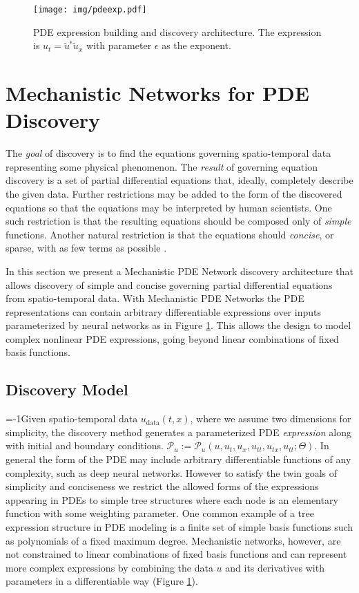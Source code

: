 
\begin{figure}
\centering
    \texttt{[image: img/pdeexp.pdf]}
  \vskip -0.1in
  \caption{PDE expression building and discovery architecture. The expression is $u_t = \tilde{u}^\epsilon \tilde{u}_x$ with parameter $\epsilon$ as the exponent.}
  \label{fig:pdeexp}
  \vskip -0.1in
\end{figure}

\section{Mechanistic Networks for PDE Discovery}
The \emph{goal} of discovery is to find the equations governing spatio-temporal data representing some physical phenomenon. 
The \emph{result} of governing equation discovery is a set of partial differential equations that, ideally, completely describe the given data.
Further restrictions may be added to the form of the discovered equations so that the equations may be interpreted by human scientists. 
One such restriction is that the resulting equations should be composed only of \emph{simple} functions. 
Another natural restriction is that the equations should \emph{concise}, or sparse, with as few terms as possible \cite{brunton2016discovering}.

In this section we present a Mechanistic PDE Network discovery architecture that allows discovery of simple and concise governing partial differential equations from spatio-temporal data.
With Mechanistic PDE Networks the PDE representations can contain arbitrary differentiable expressions over inputs parameterized by neural networks as in Figure \ref{fig:pdeexp}.
This allows the design to model complex nonlinear PDE expressions, going beyond linear combinations of fixed basis functions.



\subsection{Discovery Model}
\looseness=-1Given spatio-temporal data $u_{\text{data}}(t,x)$, where we assume two dimensions for simplicity, the discovery method generates a parameterized PDE \emph{expression} along with initial and boundary conditions.
$\mathcal{P}_u := \mathcal{P}_u(u, u_t, u_x, u_{tt}, u_{tx}, u_{tt}; \Theta)$.
In general the form of the PDE may include arbitrary differentiable functions of any complexity, such as deep neural networks.
However to satisfy the twin goals of simplicity and conciseness we restrict the allowed forms of the expressions appearing in PDEs to simple tree structures where each node is an elementary function with some weighting parameter. 
One common example of a tree expression structure in PDE modeling is a finite set of simple basis functions such as polynomials of a fixed maximum degree.
Mechanistic networks, however, are not constrained to linear combinations of fixed basis functions and can represent more complex expressions by combining the data $u$ and its derivatives with parameters in a differentiable way (Figure \ref{fig:pdeexp}).

